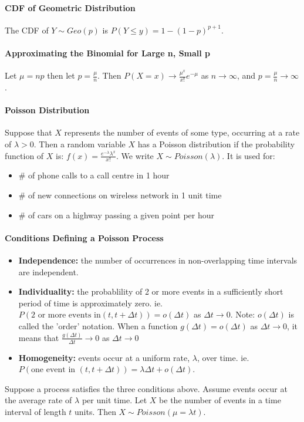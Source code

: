 \documentclass[10pt,letter]{article}
\begin{document}
\paragraph{CDF of Geometric Distribution} The CDF of $Y\sim Geo(p)$ is $P(Y\leq y)=1-(1-p)^{p+1}$.

\paragraph{Approximating the Binomial for Large n, Small p} Let $\mu=np$ then let $p = \frac{\mu}{n}$. Then $P(X=x)\rightarrow \frac{\mu^x}{x!}e^{-\mu}$ as $n\rightarrow\infty$, and $p=\frac{\mu}{n}\rightarrow\infty$.

\paragraph{Poisson Distribution} Suppose that $X$ represents the number of events of some type, occurring at a rate of $\lambda>0$. Then a random variable $X$ has a Poisson distribution if the probability function of $X$ is: $f(x)=\frac{e^{-\lambda}\lambda^x}{x!}$. We write $X\sim Poisson(\lambda)$. It is used for: 
\begin{itemize}
    \item \# of phone calls to a call centre in 1 hour
    \item \# of new connections on wireless network in 1 unit time
    \item \# of cars on a highway passing a given point per hour
\end{itemize}

\paragraph{Conditions Defining a Poisson Process} \begin{itemize}
    \item \textbf{Independence: }the number of occurrences in non-overlapping time intervals are independent.
    \item \textbf{Individuality: }the probablility of 2 or more events in a sufficiently short period of time is approximately zero. ie. $P(\text{2 or more events in}(t,t+\Delta t))=o(\Delta t)$ as $\Delta t\rightarrow0$. Note: $o(\Delta t)$ is called the 'order' notation. When a function $g(\Delta t)=o(\Delta t)$ as $\Delta t\rightarrow0$, it means that $\frac{g(\Delta t)}{\Delta t}\rightarrow 0$ as $\Delta t\rightarrow0$
    \item \textbf{Homogeneity: } events occur at a uniform rate, $\lambda$, over time. ie. $P(\text{one event in }(t,t+\Delta t))=\lambda\Delta t + o(\Delta t)$.
\end{itemize}
Suppose a process satisfies the three conditions above. Assume events occur at the average rate of $\lambda$ per unit time. Let $X$ be the number of events in a time interval of length $t$ units. Then $X\sim Poisson(\mu=\lambda t)$. 
\end{document}
